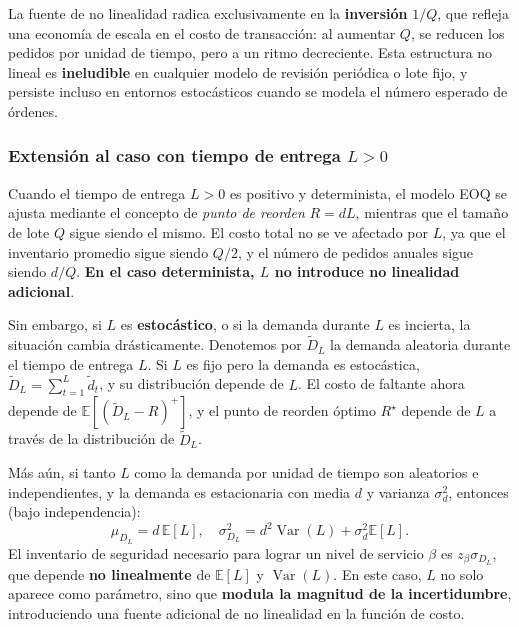 \documentclass[
  spanish,
  us-letterpaper,
]{scrreprt}
\numberwithin{equation}{section}
\begin{document}
La fuente de no linealidad radica exclusivamente en la
\textbf{inversión} \(1/Q\), que refleja una economía de escala en el
costo de transacción: al aumentar \(Q\), se reducen los pedidos por
unidad de tiempo, pero a un ritmo decreciente. Esta estructura no lineal
es \textbf{ineludible} en cualquier modelo de revisión periódica o lote
fijo, y persiste incluso en entornos estocásticos cuando se modela el
número esperado de órdenes.

\subsubsection{\texorpdfstring{Extensión al caso con tiempo de entrega
\(L > 0\)}{Extensión al caso con tiempo de entrega L \textgreater{} 0}}\label{extensiuxf3n-al-caso-con-tiempo-de-entrega-l-0}

Cuando el tiempo de entrega \(L > 0\) es positivo y determinista, el
modelo EOQ se ajusta mediante el concepto de \emph{punto de reorden}
\(R = d L\), mientras que el tamaño de lote \(Q\) sigue siendo el mismo.
El costo total no se ve afectado por \(L\), ya que el inventario
promedio sigue siendo \(Q/2\), y el número de pedidos anuales sigue
siendo \(d/Q\). \textbf{En el caso determinista, \(L\) no introduce no
linealidad adicional}.

Sin embargo, si \(L\) es \textbf{estocástico}, o si la demanda durante
\(L\) es incierta, la situación cambia drásticamente. Denotemos por
\(\tilde{D}_L\) la demanda aleatoria durante el tiempo de entrega \(L\).
Si \(L\) es fijo pero la demanda es estocástica,
\(\tilde{D}_L = \sum_{t=1}^L \tilde{d}_t\), y su distribución depende de
\(L\). El costo de faltante ahora depende de
\(\mathbb{E}[(\tilde{D}_L - R)^+]\), y el punto de reorden óptimo
\(R^\star\) depende de \(L\) a través de la distribución de
\(\tilde{D}_L\).

Más aún, si tanto \(L\) como la demanda por unidad de tiempo son
aleatorios e independientes, y la demanda es estacionaria con media
\(d\) y varianza \(\sigma_d^2\), entonces (bajo independencia): \[
\mu_{D_L} = d \, \mathbb{E}[L], \quad \sigma_{D_L}^2 = d^2 \operatorname{Var}(L) + \sigma_d^2 \mathbb{E}[L].
\] El inventario de seguridad necesario para lograr un nivel de servicio
\(\beta\) es \(z_\beta \sigma_{D_L}\), que depende \textbf{no
linealmente} de \(\mathbb{E}[L]\) y \(\operatorname{Var}(L)\). En este
caso, \(L\) no solo aparece como parámetro, sino que \textbf{modula la
magnitud de la incertidumbre}, introduciendo una fuente adicional de no
linealidad en la función de costo.
\end{document}

